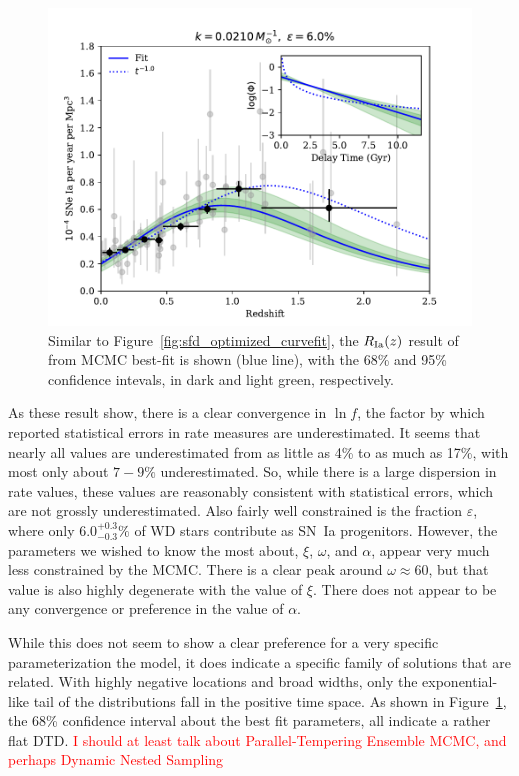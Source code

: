 \documentclass[apj]{aastex62}
\begin{document}
\begin{figure}[t] %
   \centering
   \includegraphics[width=6.5in]{figure_fit_demo_werr} 
   \caption{\footnotesize Similar to Figure~\ref{fig:sfd_optimized_curvefit}, the $R_{\rm Ia}(z)$ result of from MCMC best-fit is shown (blue line), with the 68\% and 95\% confidence intevals, in dark and light green, respectively. }
   \label{fig:figure_fit_demo_werr}
\end{figure}

As these result show, there is a clear convergence in $\ln f$, the factor by which reported statistical errors in rate measures are underestimated. It seems that nearly all values are underestimated from as little as 4\% to as much as 17\%, with most only about $7-9\%$ underestimated. So, while there is a large dispersion in rate values, these values are reasonably consistent with statistical errors, which are not grossly underestimated. Also fairly well constrained is the fraction $\varepsilon$, where only $6.0^{+0.3}_{-0.3}\%$ of WD stars contribute as SN~Ia progenitors. However, the parameters we wished to know the most about,  $\xi$, $\omega$, and $\alpha$, appear very much less constrained by the MCMC. There is a clear peak around $\omega\approx60$, but that value is also highly degenerate with the value of $\xi$.  There does not appear to be any convergence or preference in the value of $\alpha$.


While this does not seem to show a clear preference for a very specific parameterization the model, it does indicate a specific family of solutions that are related. With highly negative locations and broad widths, only the exponential-like tail of the distributions fall in the positive time space. As shown in Figure~\ref{fig:figure_fit_demo_werr}, the 68\% confidence interval about the best fit parameters, all indicate a rather flat DTD. \textcolor{red}{I should at least talk about Parallel-Tempering Ensemble MCMC, and perhaps Dynamic Nested Sampling}
\end{document}
